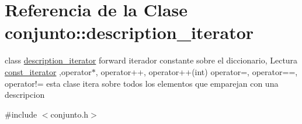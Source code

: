 \hypertarget{classconjunto_1_1description__iterator}{}\section{Referencia de la Clase conjunto\+:\+:description\+\_\+iterator}
\label{classconjunto_1_1description__iterator}


class \hyperlink{classconjunto_1_1description__iterator}{description\+\_\+iterator} forward iterador constante sobre el diccionario, Lectura \hyperlink{classconjunto_1_1const__iterator}{const\+\_\+iterator} ,operator$\ast$, operator++, operator++(int) operator=, operator==, operator!= esta clase itera sobre todos los elementos que emparejan con una descripcion  




{\ttfamily \#include $<$conjunto.\+h$>$}

